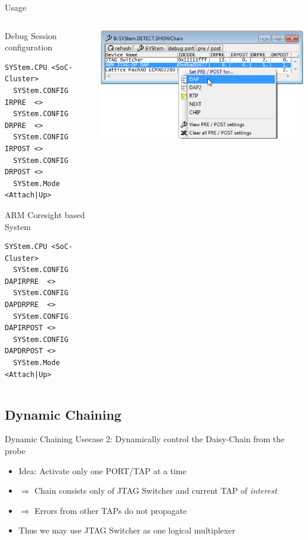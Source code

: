 \documentclass[aspectratio=169,12pt]{beamer}
\begin{document}
\begin{frame}[fragile]{Usage}
\begin{columns}[c]
\begin{column}{0.45\textwidth}
Debug Session configuration
\begin{Verbatim}[fontsize=\tiny,commandchars=\\\{\}]
  SYStem.CPU <SoC-Cluster>
  SYStem.CONFIG IRPRE  <>
  SYStem.CONFIG DRPRE  <>
  SYStem.CONFIG IRPOST <>
  SYStem.CONFIG DRPOST <>
  SYStem.Mode <Attach|Up>
\end{Verbatim}
ARM Coresight based System
\begin{Verbatim}[fontsize=\tiny,commandchars=\\\{\}]
  SYStem.CPU <SoC-Cluster>
  SYStem.CONFIG DAPIRPRE  <>
  SYStem.CONFIG DAPDRPRE  <>
  SYStem.CONFIG DAPIRPOST <>
  SYStem.CONFIG DAPDRPOST <>
  SYStem.Mode <Attach|Up>
\end{Verbatim}
\end{column}
\begin{column}{0.45\textwidth}
\includegraphics[width=\textwidth]{../png/jswitch_showchain_port12_prepost.png}
\end{column}
\end{columns}
\end{frame}

\subsection{Dynamic Chaining}

\begin{frame}{Dynamic Chaining}
Usecase 2: Dynamically control the Daisy-Chain from the probe
\begin{itemize}
\item Idea: Activate only one PORT/TAP at a time
\item $\Rightarrow$ Chain consists only of JTAG Switcher and current TAP of \emph{interest}
\item $\Rightarrow$ Errors from other TAPs do not propagate
\item Thus we may use JTAG Switcher as one logical multiplexer
\end{itemize}
\begin{center}

\end{center}
\end{frame}
\end{document}
